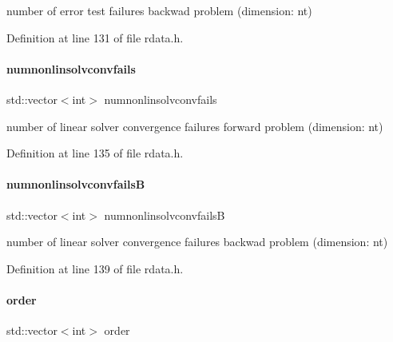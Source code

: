 number of error test failures backwad problem (dimension\+: nt) 

Definition at line 131 of file rdata.\+h.

\mbox{\label{classamici_1_1_return_data_a67818adc34db21fb3d78731c0e60462a}} 
\paragraph{\texorpdfstring{numnonlinsolvconvfails}{numnonlinsolvconvfails}}
{\footnotesize\ttfamily std\+::vector$<$int$>$ numnonlinsolvconvfails}

number of linear solver convergence failures forward problem (dimension\+: nt) 

Definition at line 135 of file rdata.\+h.

\mbox{\label{classamici_1_1_return_data_a9150501f058304e49bb6a52152cc9550}} 
\paragraph{\texorpdfstring{numnonlinsolvconvfailsB}{numnonlinsolvconvfailsB}}
{\footnotesize\ttfamily std\+::vector$<$int$>$ numnonlinsolvconvfailsB}

number of linear solver convergence failures backwad problem (dimension\+: nt) 

Definition at line 139 of file rdata.\+h.

\mbox{\label{classamici_1_1_return_data_a75a1634d2dab77d47af4eb58e6dc965e}} 
\paragraph{\texorpdfstring{order}{order}}
{\footnotesize\ttfamily std\+::vector$<$int$>$ order}

